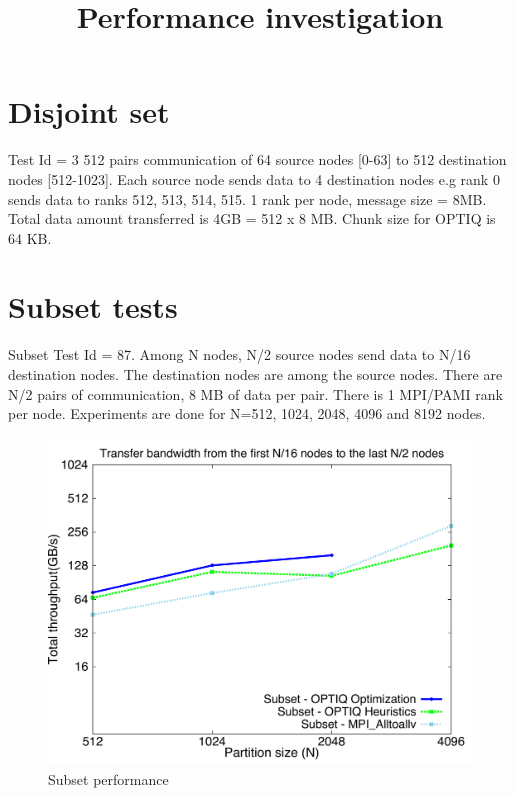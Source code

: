 \documentclass[letter]{article}
\title{Performance investigation}
\begin{document}
\maketitle

\section{Disjoint set}

Test Id = 3 512 pairs communication of 64 source nodes [0-63] to 512 destination nodes [512-1023]. Each source node sends data to 4 destination nodes e.g rank 0 sends data to ranks 512, 513, 514, 515. 1 rank per node, message size = 8MB. Total data amount transferred is 4GB = 512 x 8 MB. Chunk size for OPTIQ is 64 KB.

\section{Subset tests}

Subset Test Id = 87. Among N nodes, N/2 source nodes send data to N/16 destination nodes. The destination nodes are among the source nodes. There are N/2 pairs of communication, 8 MB of data per pair. There is 1 MPI/PAMI rank per node. Experiments are done for N=512, 1024, 2048, 4096 and 8192 nodes.

\begin{figure}[!htb]
\vspace{-0.1in}
\centering
\includegraphics[scale=0.30]{report_figures/constantr_subset.pdf}
\vspace{-0.1in}
\caption{Subset performance}
\vspace{-0.1in}
\label{fig:patterns}
\end{figure}
\end{document}
